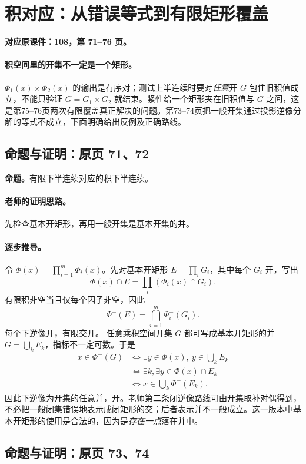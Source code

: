 \documentclass[11pt,a4paper]{article}
\theoremstyle{definition}\newtheorem{definition}{定义}\newtheorem{example}{例}
\begin{document}
\clearpage\section{积对应：从错误等式到有限矩形覆盖}\label{g:108:71}

\textbf{对应原课件：108，第 71--76 页。}


\paragraph{积空间里的开集不一定是一个矩形。}
$\Phi_1(x)\times\Phi_2(x)$ 的输出是有序对；测试上半连续时要对\emph{任意}开 $G$ 包住旧积值成立，不能只验证 $G=G_1\times G_2$ 就结束。紧性给一个矩形夹在旧积值与 $G$ 之间，这是第75--76页两次有限覆盖真正解决的问题。第73--74页把一般开集通过投影逆像分解的等式不成立，下面明确给出反例及正确路线。


\subsection{命题与证明：原页 71、72}

\textbf{命题。}有限下半连续对应的积下半连续。

\paragraph{老师的证明思路。}先检查基本开矩形，再用一般开集是基本开集的并。

\paragraph{逐步推导。}
令 $\Phi(x)=\prod_{i=1}^m\Phi_i(x)$。先对基本开矩形 $E=\prod_iG_i$，其中每个 $G_i$ 开，写出
\[\Phi(x)\cap E=\prod_i(\Phi_i(x)\cap G_i).\]
有限积非空当且仅每个因子非空，因此
\[\Phi^-(E)=\bigcap_{i=1}^m\Phi_i^-(G_i).\]
每个下逆像开，有限交开。
任意乘积空间开集 $G$ 都可写成基本开矩形的并 $G=\bigcup_kE_k$，指标不一定可数。于是
\begin{align*}
x\in\Phi^-(G)&\iff\exists y\in\Phi(x),\ y\in\bigcup_kE_k\\
&\iff\exists k,\exists y\in\Phi(x)\cap E_k\\
&\iff x\in\bigcup_k\Phi^-(E_k).
\end{align*}
因此下逆像为开集的任意并，开。老师第二条闭逆像路线可由开集取补对偶得到，不必把一般闭集错误地表示成闭矩形的交；后者表示并不一般成立。这一版本中基本开矩形的使用是合法的，因为是\emph{存在一点}落在并中。


\subsection{命题与证明：原页 73、74}
\end{document}

